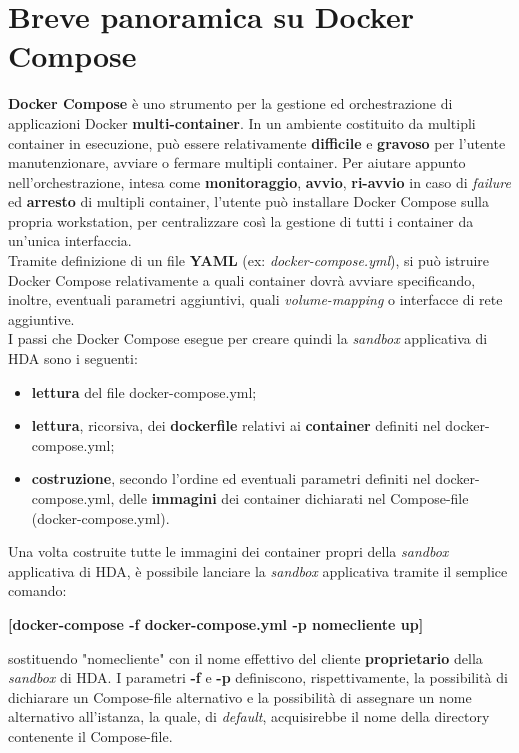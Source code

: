 \section{Breve panoramica su Docker Compose}
\textbf{Docker Compose} è uno strumento per la gestione ed orchestrazione di applicazioni Docker \textbf{multi-container}. In un ambiente costituito da multipli container in esecuzione, può essere relativamente \textbf{difficile} e \textbf{gravoso} per l'utente manutenzionare, avviare o fermare multipli container. Per aiutare appunto nell'orchestrazione, intesa come \textbf{monitoraggio}, \textbf{avvio}, \textbf{ri-avvio} in caso di \textit{failure} ed \textbf{arresto} di multipli container, l'utente può installare Docker Compose sulla propria workstation, per centralizzare così la gestione di tutti i container da un'unica interfaccia.\\
Tramite definizione di un file \textbf{YAML} (ex: \textit{docker-compose.yml}), si può istruire Docker Compose relativamente a quali container dovrà avviare specificando, inoltre, eventuali parametri aggiuntivi, quali \textit{volume-mapping} o interfacce di rete aggiuntive.\\
I passi che Docker Compose esegue per creare quindi la \textit{sandbox} applicativa di HDA sono i seguenti:
\begin{itemize}
	\item \textbf{lettura} del file docker-compose.yml;
	\item \textbf{lettura}, ricorsiva, dei \textbf{dockerfile} relativi ai \textbf{container} definiti nel docker-compose.yml;
	\item \textbf{costruzione}, secondo l'ordine ed eventuali parametri definiti nel docker-compose.yml, delle \textbf{immagini} dei container dichiarati nel Compose-file (docker-compose.yml).
\end{itemize}
Una volta costruite tutte le immagini dei container propri della \textit{sandbox} applicativa di HDA, è possibile lanciare la \textit{sandbox} applicativa tramite il semplice comando: \centerline{\textbf{[docker-compose
-f docker-compose.yml -p nomecliente up]}} sostituendo "nomecliente" con il nome effettivo del cliente \textbf{proprietario} della \textit{sandbox} di HDA. I parametri \textbf{-f} e \textbf{-p} definiscono, rispettivamente, la possibilità di dichiarare un Compose-file alternativo e la possibilità di assegnare un nome alternativo all'istanza, la quale, di \textit{default}, acquisirebbe il nome della directory contenente il Compose-file.

